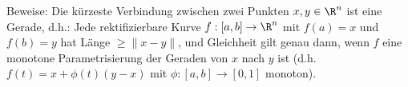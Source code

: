 \begin{prob}
Beweise: Die k\"urzeste Verbindung zwischen zwei Punkten $x,y\in\R^n$
ist eine Gerade, d.h.: Jede rektifizierbare Kurve $f:[a,b]\to\R^n$ 
mit $f(a)=x$ und $f(b)=y$ hat L\"ange $\geq\|x-y\|$, und Gleichheit
gilt genau dann, wenn $f$ eine monotone Parametrisierung der Geraden
von $x$ nach $y$ ist (d.h.~$f(t)=x+\phi(t)(y-x)$ mit
$\phi:[a,b]\to[0,1]$ monoton). 
\end{prob}

